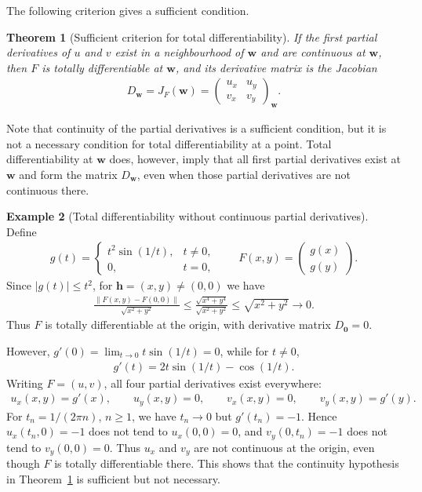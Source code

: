 \documentclass[11pt]{article}
\theoremstyle{plain}
\newtheorem{theorem}{Theorem}[section]
\theoremstyle{definition}
\newtheorem{example}[theorem]{Example}
\theoremstyle{remark}
\numberwithin{equation}{section}
\newcommand{\be}{\begin{eqnarray}}
\newcommand{\ee}{\end{eqnarray}}
\newcommand{\ww}{\mathbf w}
\newcommand{\hh}{\mathbf h}
\begin{document}
The following criterion gives a sufficient condition.
\begin{theorem}[Sufficient criterion for total differentiability]
\label{thm:total-differentiability-criterion}
If the first partial derivatives of $u$ and $v$ exist in a neighbourhood
of $\ww$ and are continuous at $\ww$, then $F$ is totally differentiable
at $\ww$, and its derivative matrix is the Jacobian
\be
 D_{\ww}=J_F(\ww)=
 \begin{pmatrix}u_x&u_y\\v_x&v_y\end{pmatrix}_{\ww}.
\ee
\end{theorem}
Note that continuity of the partial derivatives is a sufficient condition, but it is not a necessary condition for total
differentiability at a point. Total differentiability at $\ww$ does, however,
imply that all first partial derivatives exist at $\ww$ and form the matrix
$D_{\ww}$, even when those partial derivatives are not continuous there.

\begin{example}[Total differentiability without continuous partial derivatives]
Define
\be
 g(t)=\begin{cases}
 t^2\sin(1/t),&t\ne0,\\
 0,&t=0,
 \end{cases}
 \qquad
 F(x,y)=\begin{pmatrix}g(x)\\g(y)\end{pmatrix}.
\ee
Since $|g(t)|\le t^2$, for $\hh=(x,y)\ne(0,0)$ we have
\be
 \frac{\|F(x,y)-F(0,0)\|}{\sqrt{x^2+y^2}}
 \le\frac{\sqrt{x^4+y^4}}{\sqrt{x^2+y^2}}
 \le\sqrt{x^2+y^2}\longrightarrow0.
\ee
Thus $F$ is totally differentiable at the origin, with derivative matrix
$D_{\mathbf 0}=0$.

However, $g'(0)=\lim_{t\to0}t\sin(1/t)=0$, while for $t\ne0$,
\be
 g'(t)=2t\sin(1/t)-\cos(1/t).
\ee
Writing $F=(u,v)$, all four partial derivatives exist everywhere:
\be
 u_x(x,y)=g'(x),\qquad u_y(x,y)=0,\qquad
 v_x(x,y)=0,\qquad v_y(x,y)=g'(y).
\ee
For $t_n=1/(2\pi n)$, $n\ge1$, we have $t_n\to0$ but
$g'(t_n)=-1$. Hence $u_x(t_n,0)=-1$ does not tend to $u_x(0,0)=0$,
and $v_y(0,t_n)=-1$ does not tend to $v_y(0,0)=0$.
Thus $u_x$ and $v_y$ are not continuous at the origin, even though
$F$ is totally differentiable there. This shows that the continuity
hypothesis in Theorem~\ref{thm:total-differentiability-criterion}
is sufficient but not necessary.
\end{example}
\end{document}
